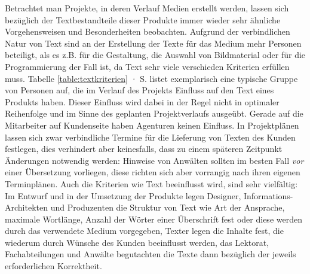 Betrachtet man Projekte, in deren Verlauf Medien erstellt werden, lassen sich bezüglich der Textbestandteile dieser Produkte immer wieder sehr ähnliche Vorgehensweisen und Besonderheiten beobachten. Aufgrund der verbindlichen Natur von Text sind an der Erstellung der Texte für das Medium mehr Personen beteiligt, als es z.B. für die Gestaltung, die Auswahl von Bildmaterial oder für die Programmierung der Fall ist, da Text sehr viele verschieden Kriterien erfüllen muss. Tabelle \ref{table:textkriterien} · S.\pageref{table:textkriterien} listet exemplarisch eine typische Gruppe von Personen auf, die im Verlauf des Projekts Einfluss auf den Text eines Produkts haben. Dieser Einfluss wird dabei in der Regel nicht in optimaler Reihenfolge und im Sinne des geplanten Projektverlaufs ausgeübt. Gerade auf die Mitarbeiter auf Kundenseite haben Agenturen keinen Einfluss. In Projektplänen lassen sich zwar verbindliche Termine für die Lieferung von Texten des Kunden festlegen, dies verhindert aber keinesfalls, dass zu einem späteren Zeitpunkt Änderungen notwendig werden: Hinweise von Anwälten sollten im besten Fall \emph{vor} einer Übersetzung vorliegen, diese richten sich aber vorrangig nach ihren eigenen Terminplänen. Auch die Kriterien wie Text beeinflusst wird, sind sehr vielfältig: Im Entwurf und in der Umsetzung der Produkte legen Designer, Informations-Architekten und Produzenten die Struktur von Text wie Art der Ansprache, maximale Wortlänge, Anzahl der Wörter einer Überschrift fest oder diese werden durch das verwendete Medium vorgegeben, Texter legen die Inhalte fest, die wiederum durch Wünsche des Kunden beeinflusst werden, das Lektorat, Fachabteilungen und Anwälte begutachten die Texte dann bezüglich der jeweils erforderlichen Korrektheit.

